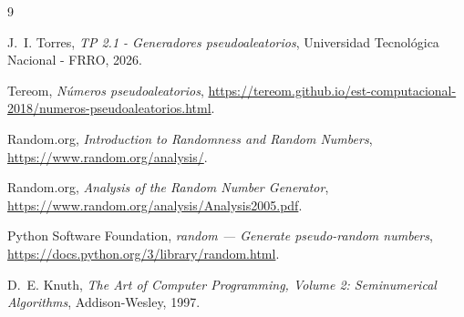 \documentclass{article}
\begin{document}


\begin{thebibliography}{9}

J.~I. Torres, \textit{TP 2.1 - Generadores pseudoaleatorios},
Universidad Tecnológica Nacional - FRRO, 2026.

Tereom, \textit{Números pseudoaleatorios},
\url{https://tereom.github.io/est-computacional-2018/numeros-pseudoaleatorios.html}.

Random.org, \textit{Introduction to Randomness and Random Numbers},
\url{https://www.random.org/analysis/}.

Random.org, \textit{Analysis of the Random Number Generator},
\url{https://www.random.org/analysis/Analysis2005.pdf}.

Python Software Foundation, \textit{random --- Generate pseudo-random numbers},
\url{https://docs.python.org/3/library/random.html}.

D.~E. Knuth, \textit{The Art of Computer Programming, Volume 2:
Seminumerical Algorithms}, Addison-Wesley, 1997.

\end{thebibliography}
\end{document}
